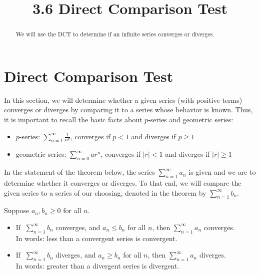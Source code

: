 \documentclass[handout]{ximera}
\title{3.6 Direct Comparison Test}
\begin{document}
\begin{abstract}
We will use the DCT to determine if an infinite series converges or diverges.
\end{abstract}

\maketitle

\section{Direct Comparison Test}

In this section, we will determine whether a given series (with positive terms) 
converges or diverges by comparing it to a series whose behavior is known. 
Thus, it is important to recall the basic facts about $p$-series and geometric series: 
\begin{itemize}
\item
 $p$-series: \; $\displaystyle \sum_{n=1}^\infty \frac{1}{n^p}$, 
converges if \;$p<1$ \;and diverges if \;$p\geq 1$
\item
geometric series:   $\displaystyle \sum_{n=0}^\infty ar^n$, converges if \;$|r|<1$\; and 
diverges if \;$|r|\geq 1$
\end{itemize}

In the statement of the theorem below, the series $\displaystyle \sum_{n=1}^\infty a_n$ is 
given and we are to determine whether it converges or diverges. To that end, we will 
compare the given series to a series of our choosing, denoted in the theorem 
by $\displaystyle \sum_{n=1}^\infty b_n$.


\begin{theorem}
 Suppose $a_n, b_n \geq 0$ for all $n$.\\
\begin{itemize}
\item
If $\; \displaystyle{\sum_{n=1}^\infty b_n}$ converges, and $a_n \leq b_n$ for all $n$,  
then $\displaystyle{\sum_{n=1}^\infty a_n}$ converges.\\
In words: less than a convergent series is convergent.\\
\item
If $\; \displaystyle{\sum_{n=1}^\infty b_n}$ diverges, and $a_n \geq b_n$ for all $n$,  
then $\displaystyle{\sum_{n=1}^\infty a_n}$ diverges.\\
In words: greater than a divergent series is divergent.\\
\end{itemize}
\end{theorem}
\end{document}
